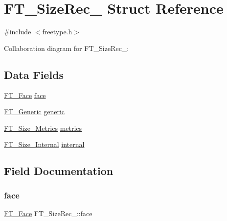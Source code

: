 \hypertarget{struct_f_t___size_rec__}{}\section{F\+T\+\_\+\+Size\+Rec\+\_\+ Struct Reference}
\label{struct_f_t___size_rec__}


{\ttfamily \#include $<$freetype.\+h$>$}



Collaboration diagram for F\+T\+\_\+\+Size\+Rec\+\_\+\+:
\subsection*{Data Fields}
\begin{DoxyCompactItemize}
\item 
\hyperlink{freetype_8h_a7eba045ee20968354fa1bff0f69740fa}{F\+T\+\_\+\+Face} \hyperlink{struct_f_t___size_rec___a21b54fb07feaba8be23321054da98f5f}{face}
\item 
\hyperlink{fttypes_8h_ae15e8550dd7d863328686aadaead5c77}{F\+T\+\_\+\+Generic} \hyperlink{struct_f_t___size_rec___aa24520b093a9b4ba9ff388bfe7b9491d}{generic}
\item 
\hyperlink{freetype_8h_a8b7a8201f8d155cac76cfb03302c2672}{F\+T\+\_\+\+Size\+\_\+\+Metrics} \hyperlink{struct_f_t___size_rec___a29a6b518d09f6cf1714d9aed01eddc01}{metrics}
\item 
\hyperlink{freetype_8h_a59c5fa003a18285aab769cb96252499c}{F\+T\+\_\+\+Size\+\_\+\+Internal} \hyperlink{struct_f_t___size_rec___a236c47ea3138e485c29b0d7baa5cf3b6}{internal}
\end{DoxyCompactItemize}


\subsection{Field Documentation}
\mbox{\label{struct_f_t___size_rec___a21b54fb07feaba8be23321054da98f5f}} 
\subsubsection{\texorpdfstring{face}{face}}
{\footnotesize\ttfamily \hyperlink{freetype_8h_a7eba045ee20968354fa1bff0f69740fa}{F\+T\+\_\+\+Face} F\+T\+\_\+\+Size\+Rec\+\_\+\+::face}

